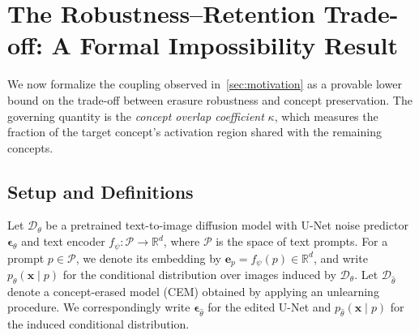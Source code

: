 \section{The Robustness--Retention Trade-off: A Formal Impossibility Result}
\label{sec:tradeoff}

We now formalize the coupling observed in~\cref{sec:motivation} as a provable lower bound on the trade-off between erasure robustness and concept preservation. The governing quantity is the \emph{concept overlap coefficient} $\kappa$, which measures the fraction of the target concept's activation region shared with the remaining concepts.

\subsection{Setup and Definitions}
\label{subsec:definitions}

Let $\mathcal{D}_\theta$ be a pretrained text-to-image diffusion model with U{-}Net noise predictor $\boldsymbol{\epsilon}_\theta$ and text encoder $f_\psi : \mathcal{P} \to \mathbb{R}^d$, where $\mathcal{P}$ is the space of text prompts. 
For a prompt $p \in \mathcal{P}$, we denote its embedding by $\mathbf{e}_p = f_\psi(p) \in \mathbb{R}^d$, and write $p_\theta(\mathbf{x} \mid p)$ for the conditional distribution over images induced by $\mathcal{D}_\theta$.
Let $\mathcal{D}_{\hat\theta}$ denote a concept-erased model (CEM) obtained by applying an unlearning procedure. 
We correspondingly write $\boldsymbol{\epsilon}_{\hat\theta}$ for the edited U-Net and $p_{\hat\theta}(\mathbf{x} \mid p)$ for the induced conditional distribution. 

